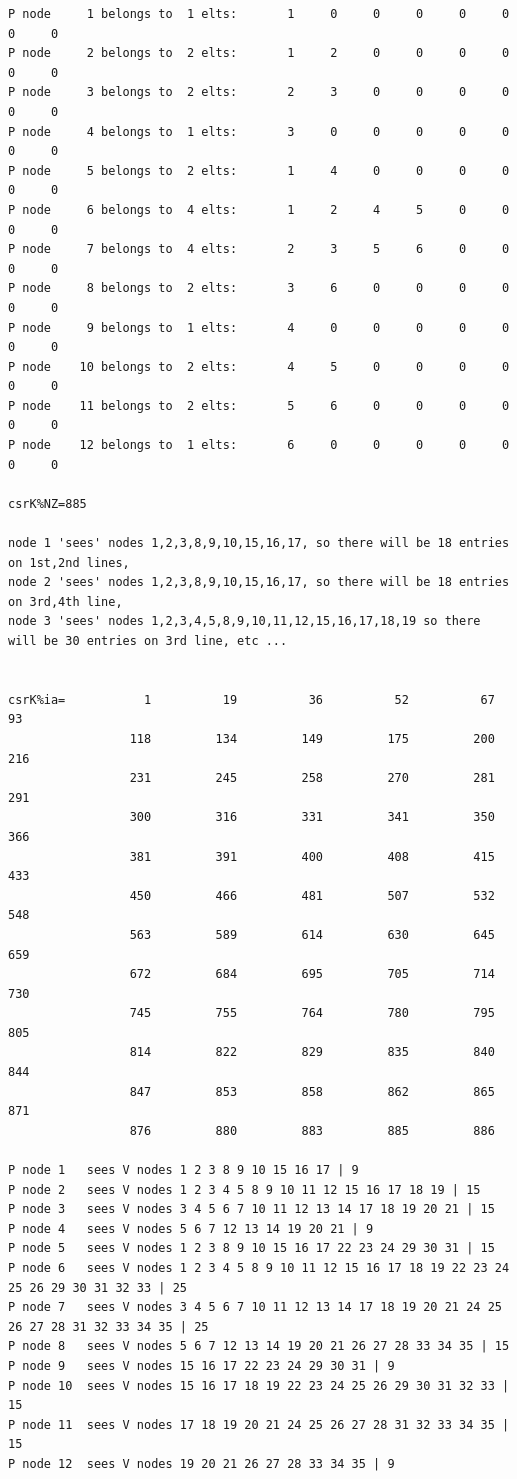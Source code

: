 \begin{small}
\begin{verbatim}
P node     1 belongs to  1 elts:       1     0     0     0     0     0     0     0
P node     2 belongs to  2 elts:       1     2     0     0     0     0     0     0
P node     3 belongs to  2 elts:       2     3     0     0     0     0     0     0
P node     4 belongs to  1 elts:       3     0     0     0     0     0     0     0
P node     5 belongs to  2 elts:       1     4     0     0     0     0     0     0
P node     6 belongs to  4 elts:       1     2     4     5     0     0     0     0
P node     7 belongs to  4 elts:       2     3     5     6     0     0     0     0
P node     8 belongs to  2 elts:       3     6     0     0     0     0     0     0
P node     9 belongs to  1 elts:       4     0     0     0     0     0     0     0
P node    10 belongs to  2 elts:       4     5     0     0     0     0     0     0
P node    11 belongs to  2 elts:       5     6     0     0     0     0     0     0
P node    12 belongs to  1 elts:       6     0     0     0     0     0     0     0

csrK%NZ=885

node 1 'sees' nodes 1,2,3,8,9,10,15,16,17, so there will be 18 entries on 1st,2nd lines,
node 2 'sees' nodes 1,2,3,8,9,10,15,16,17, so there will be 18 entries on 3rd,4th line,
node 3 'sees' nodes 1,2,3,4,5,8,9,10,11,12,15,16,17,18,19 so there will be 30 entries on 3rd line, etc ...

            
csrK%ia=           1          19          36          52          67          93
                 118         134         149         175         200         216
                 231         245         258         270         281         291
                 300         316         331         341         350         366
                 381         391         400         408         415         433
                 450         466         481         507         532         548
                 563         589         614         630         645         659
                 672         684         695         705         714         730
                 745         755         764         780         795         805
                 814         822         829         835         840         844
                 847         853         858         862         865         871
                 876         880         883         885         886

P node 1   sees V nodes 1 2 3 8 9 10 15 16 17 | 9
P node 2   sees V nodes 1 2 3 4 5 8 9 10 11 12 15 16 17 18 19 | 15
P node 3   sees V nodes 3 4 5 6 7 10 11 12 13 14 17 18 19 20 21 | 15
P node 4   sees V nodes 5 6 7 12 13 14 19 20 21 | 9
P node 5   sees V nodes 1 2 3 8 9 10 15 16 17 22 23 24 29 30 31 | 15
P node 6   sees V nodes 1 2 3 4 5 8 9 10 11 12 15 16 17 18 19 22 23 24 25 26 29 30 31 32 33 | 25
P node 7   sees V nodes 3 4 5 6 7 10 11 12 13 14 17 18 19 20 21 24 25 26 27 28 31 32 33 34 35 | 25
P node 8   sees V nodes 5 6 7 12 13 14 19 20 21 26 27 28 33 34 35 | 15 
P node 9   sees V nodes 15 16 17 22 23 24 29 30 31 | 9
P node 10  sees V nodes 15 16 17 18 19 22 23 24 25 26 29 30 31 32 33 | 15 
P node 11  sees V nodes 17 18 19 20 21 24 25 26 27 28 31 32 33 34 35 | 15
P node 12  sees V nodes 19 20 21 26 27 28 33 34 35 | 9


\end{verbatim}
\end{small}
